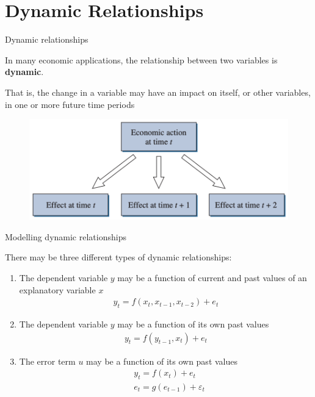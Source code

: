 \documentclass[10pt,aspectratio=169]{beamer}  %
\begin{document}

\section{Dynamic Relationships}


\begin{frame}{Dynamic relationships}

    \bigskip
    In many economic applications, the relationship between two variables is \textbf{dynamic}.

    \medskip
    That is, the change in a variable may have an impact on itself, or other variables, in one or more future time periods
    \begin{figure}[H]
        \centering
        \includegraphics[height=0.2\textwidth]{./fig/dynamic-effects.png}
    \end{figure}

\end{frame}


\begin{frame}{Modelling dynamic relationships}

    \bigskip

    There may be three different types of dynamic relationships:
    \begin{enumerate}
        \item The dependent variable $ y $ may be a function of current and past values of an explanatory variable $ x $
        \begin{align*}
            y_{t} = f(x_{t}, x_{t-1}, x_{t-2}) + e_{t}
        \end{align*}
        \item The dependent variable $ y $ may be a function of its own past values
        \begin{align*}
            y_{t} = f(y_{t-1}, x_{t}) + e_{t}
        \end{align*}
        \item The error term $ u $ may be a function of its own past values
        \begin{align*}
            & y_{t} = f(x_{t}) + e_{t} \\
            & e_{t} = g(e_{t-1}) + \varepsilon_{t}
        \end{align*}

    \end{enumerate}

\end{frame}
\end{document}
